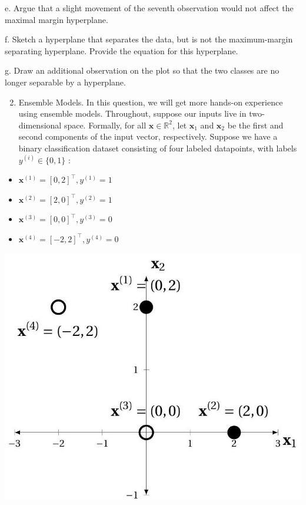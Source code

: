 \documentclass[10pt]{article}
\begin{document}
e. Argue that a slight movement of the seventh observation would not affect the maximal margin hyperplane.

f. Sketch a hyperplane that separates the data, but is not the maximum-margin separating hyperplane. Provide the equation for this hyperplane.

g. Draw an additional observation on the plot so that the two classes are no longer separable by a hyperplane.

\begin{enumerate}
  \setcounter{enumi}{1}
  \item Ensemble Models. In this question, we will get more hands-on experience using ensemble models. Throughout, suppose our inputs live in two-dimensional space. Formally, for all $\mathbf{x} \in \mathbb{R}^{2}$, let $\mathbf{x}_{1}$ and $\mathbf{x}_{2}$ be the first and second components of the input vector, respectively. Suppose we have a binary classification dataset consisting of four labeled datapoints, with labels $y^{(i)} \in\{0,1\}$ :
\end{enumerate}

\begin{itemize}
  \item $\mathbf{x}^{(1)}=[0,2]^{\top}, y^{(1)}=1$

  \item $\mathbf{x}^{(2)}=[2,0]^{\top}, y^{(2)}=1$

  \item $\mathbf{x}^{(3)}=[0,0]^{\top}, y^{(3)}=0$

  \item $\mathbf{x}^{(4)}=[-2,2]^{\top}, y^{(4)}=0$

\end{itemize}

\begin{center}
\includegraphics[max width=\textwidth]{2023_11_03_3a37fc63330e1b210712g-8}
\end{center}
\end{document}
